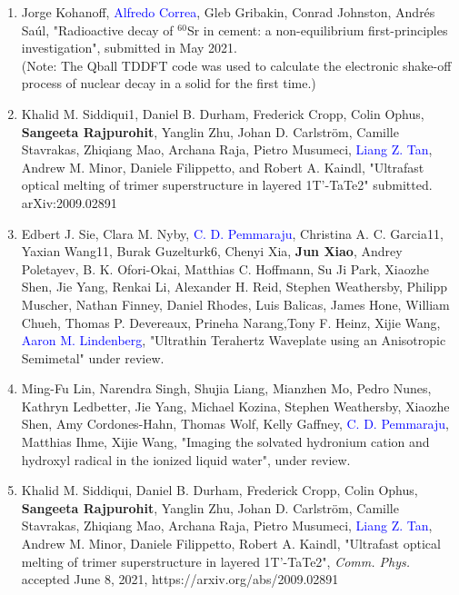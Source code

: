 \begin{enumerate}
    \item Jorge Kohanoff, \textcolor{blue}{Alfredo Correa}, Gleb Gribakin, Conrad Johnston, Andr\'{e}s Sa\'{u}l, "Radioactive decay of $^{60}$Sr in cement: a non-equilibrium first-principles investigation", submitted in May 2021.\\
    (Note: The Qball TDDFT code was used to calculate the electronic shake-off process of nuclear decay in a solid for the first time.)

    \item Khalid M. Siddiqui1, Daniel B. Durham, Frederick Cropp, Colin Ophus, {\bf Sangeeta Rajpurohit}, Yanglin Zhu, Johan D. Carlstr\"{o}m, Camille Stavrakas, Zhiqiang Mao, Archana Raja, Pietro Musumeci, \textcolor{blue}{Liang Z. Tan}, Andrew M. Minor, Daniele Filippetto, and Robert A. Kaindl, "Ultrafast optical melting of trimer superstructure in layered 1T’-TaTe2" submitted.  arXiv:2009.02891

    \item Edbert J. Sie, Clara M. Nyby, \textcolor{blue}{C. D. Pemmaraju}, Christina A. C. Garcia11, Yaxian Wang11, Burak Guzelturk6, Chenyi Xia, {\bf Jun Xiao}, Andrey Poletayev, B. K. Ofori-Okai, Matthias C. Hoffmann, Su Ji Park, Xiaozhe Shen, Jie Yang, Renkai Li, Alexander H. Reid, Stephen Weathersby, Philipp Muscher, Nathan Finney, Daniel Rhodes, Luis Balicas, James Hone, William Chueh, Thomas P. Devereaux, Prineha Narang,Tony F. Heinz, Xijie Wang, \textcolor{blue}{Aaron M. Lindenberg}, "Ultrathin Terahertz Waveplate using an Anisotropic Semimetal" under review.
    
    \item Ming-Fu Lin, Narendra Singh, Shujia Liang, Mianzhen Mo, Pedro Nunes, Kathryn Ledbetter, Jie Yang, Michael Kozina, Stephen Weathersby, Xiaozhe Shen, Amy Cordones-Hahn, Thomas Wolf, Kelly Gaffney, \textcolor{blue}{C. D. Pemmaraju}, Matthias Ihme, Xijie Wang, "Imaging the solvated hydronium cation and hydroxyl radical in the ionized liquid water", under review.

    \item Khalid M. Siddiqui, Daniel B. Durham, Frederick Cropp, Colin Ophus, {\bf Sangeeta Rajpurohit}, Yanglin Zhu, Johan D. Carlström, Camille Stavrakas, Zhiqiang Mao, Archana Raja, Pietro Musumeci, \textcolor{blue}{Liang Z. Tan}, Andrew M. Minor, Daniele Filippetto, Robert A. Kaindl, "Ultrafast optical melting of trimer superstructure in layered 1T'-TaTe2", {\it Comm. Phys.} accepted June 8, 2021, https://arxiv.org/abs/2009.02891 


\end{enumerate}
